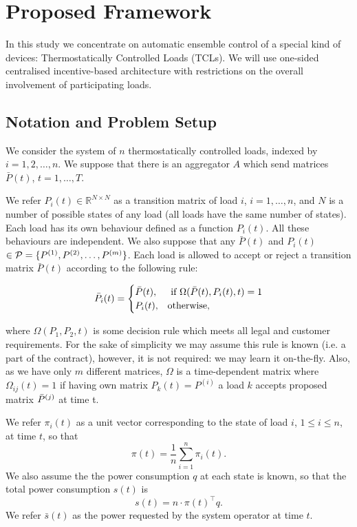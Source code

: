 \chapter{Proposed Framework}
In this study we concentrate on automatic ensemble control of a special kind of devices: Thermostatically Controlled Loads (TCLs). We will use one-sided centralised incentive-based architecture with restrictions on the overall involvement of participating loads. 




\section{Notation and Problem Setup} We consider the system of $n$ thermostatically controlled loads, indexed by $i = 1, 2, \dots, n$. We suppose that there is an aggregator $A$ which send matrices ${\bar P}(t)$, $t=1, \dots, T$.

We refer $P_i(t) \in \mathbb{R}^{N\times N}$ as a transition matrix of load $i$, $i = 1, \dots, n$, and $N$ is a number of possible states of any load (all loads have the same number of states). Each load has its own behaviour defined as a function $P_i(t)$. All these behaviours are independent. We also suppose that any ${\bar P}(t)$ and $P_{i}(t)$  $\in {\cal P} = \{P^{(1)}, P^{(2)}, \dots, P^{(m)}\}$. Each load is allowed to accept or reject a transition matrix ${\bar P}(t)$ according to the following rule: 


\[
    {\bar P_i}(t) = 
    \begin{cases}
    {\bar P}(t), & \text{ if } \Omega({\bar P}(t),P_{i}(t), t) = 1\\
    P_i(t), & \text{otherwise},
    \end{cases}
\]

where $\Omega(P_1, P_2, t)$ is some decision rule which meets all legal and customer requirements. For the sake of simplicity we may assume this rule is known (i.e. a part of the contract), however, it is not required: we may learn it on-the-fly. Also, as we have only $m$ different matrices, $\Omega$ is a time-dependent matrix where $\Omega_{ij}(t) = 1$ if having own matrix $P_k(t) = P^{(i)}$ a load $k$ accepts proposed matrix ${\bar P}^{(j)}$ at time t. 


%
We refer $\pi_i(t)$ as a unit vector corresponding to the state of load $i$, $1\le i \le n$, at time $t$, so that 
\[\pi(t) = \frac{1}{n}\sum_{i=1}^n \pi_i(t).\]
We also assume the the power consumption $q$ at each state is known, so that the total power consumption $s(t)$ is 
\[s(t) = n\cdot \pi(t)^\top q.\]
We refer ${\bar s}(t)$ as the power requested by the system operator at time $t$. 

